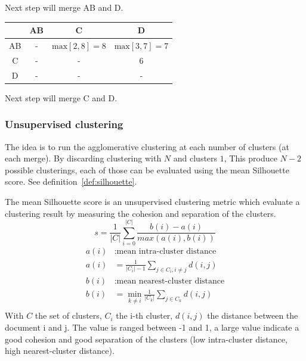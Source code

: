 \begin{example}
  \vspace{0.2cm}
  Next step will merge AB and D.

  \vspace{0.5cm}

  \begin{subexample}{\linewidth}
    \centering
    \begin{tabular}{c|c c c}
      \toprule
        & AB & C & D \\
      \midrule
      AB & - & $\text{max} \left[2, 8 \right] = 8$ & $\text{max} \left[3, 7 \right] = 7$ \\
      C  & - & - & 6 \\
      D  & - & - & - \\
      \bottomrule
    \end{tabular}
  \end{subexample}

  \vspace{0.2cm}
  Next step will merge C and D.
\end{example}

\subsubsection{Unsupervised clustering \label{sec:unsupervised_clustering}}

The idea is to run the agglomerative clustering at each number of clusters (at each merge).
By discarding clustering with $N$ and clusters $1$, This produce $N - 2$ possible clusterings, each of those can be evaluated using the mean Silhouette score.
See definition~\ref{def:silhouette}.

\begin{definition}
  \label{def:silhouette}
  The mean Silhouette score is an unsupervised clustering metric which evaluate a clustering result by measuring the cohesion and separation of the clusters.
  \begin{equation}
    s = \frac{1}{|C|} \sum_{i = 0}^{|C|} \frac{b(i) - a(i)}{max(a(i), b(i))}
  \end{equation}
  \begin{equation*}
    \begin{split}
      a(i)&: \text{mean intra-cluster distance} \\
      a(i)& = \frac{1}{|C_i| - 1} \sum_{j \in C_i, i\neq j} d(i, j) \\
      b(i)&: \text{mean nearest-cluster distance} \\
      b(i)& = \min_{k\neq i} \frac{1}{|C_k|} \sum_{j \in C_k} d(i, j) \\
    \end{split}
  \end{equation*}
  With $C$ the set of clusters, $C_i$ the i-th cluster, $d(i, j)$ the distance between the document i and j.
  The value is ranged between -1 and 1, a large value indicate a good cohesion and good separation of the clusters (low intra-cluster distance, high nearest-cluster distance).
\end{definition}

